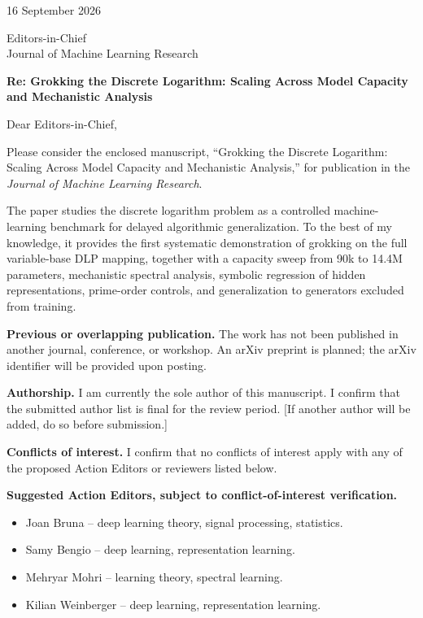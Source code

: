 \documentclass[11pt]{article}
\begin{document}
\begin{flushright}
16 September 2026
\end{flushright}

Editors-in-Chief\\
Journal of Machine Learning Research

\textbf{Re: Grokking the Discrete Logarithm: Scaling Across Model Capacity and Mechanistic Analysis}

Dear Editors-in-Chief,

Please consider the enclosed manuscript, ``Grokking the Discrete Logarithm: Scaling Across Model Capacity and Mechanistic Analysis,'' for publication in the \emph{Journal of Machine Learning Research}.

The paper studies the discrete logarithm problem as a controlled machine-learning benchmark for delayed algorithmic generalization. To the best of my knowledge, it provides the first systematic demonstration of grokking on the full variable-base DLP mapping, together with a capacity sweep from 90k to 14.4M parameters, mechanistic spectral analysis, symbolic regression of hidden representations, prime-order controls, and generalization to generators excluded from training.

\textbf{Previous or overlapping publication.} The work has not been published in another journal, conference, or workshop. An arXiv preprint is planned; the arXiv identifier will be provided upon posting.

\textbf{Authorship.} I am currently the sole author of this manuscript. I confirm that the submitted author list is final for the review period. [If another author will be added, do so before submission.]

\textbf{Conflicts of interest.} I confirm that no conflicts of interest apply with any of the proposed Action Editors or reviewers listed below.

\textbf{Suggested Action Editors, subject to conflict-of-interest verification.}
\begin{itemize}
  \item Joan Bruna -- deep learning theory, signal processing, statistics.
  \item Samy Bengio -- deep learning, representation learning.
  \item Mehryar Mohri -- learning theory, spectral learning.
  \item Kilian Weinberger -- deep learning, representation learning.
\end{itemize}
\end{document}
